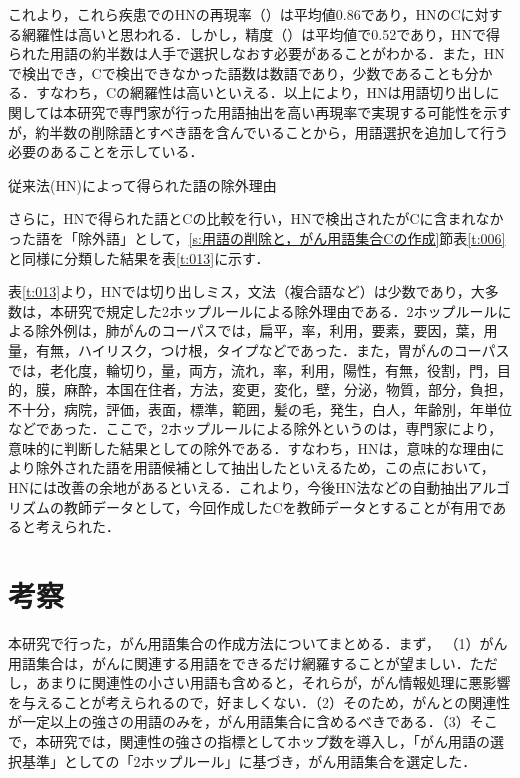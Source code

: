 \documentclass[japanese]{jnlp_1.4}
\def\maru#1{}
\begin{document}
これより，これら疾患でのHNの再現率（\maru{8}）は平均値0.86であり，HNのCに対する網羅性は高いと思われる．しかし，精度（\maru{7}）は平均値で0.52であり，HNで得られた用語の約半数は人手で選択しなおす必要があることがわかる．また，HNで検出でき，Cで検出できなかった語数\maru{6}は数語であり，少数であることも分かる．すなわち，Cの網羅性は高いといえる．以上により，HNは用語切り出しに関しては本研究で専門家が行った用語抽出を高い再現率で実現する可能性を示すが，約半数の削除語とすべき語を含んでいることから，用語選択を追加して行う必要のあることを示している．

\begin{table}[b]
 \caption{従来法(HN)によって得られた語の除外理由}
 \begin{center}

 \end{center}
 \label{t:013}
\end{table}

さらに，HNで得られた語とCの比較を行い，HNで検出されたがCに含まれなかった語を「除外語」として，\ref{s:用語の削除と，がん用語集合Cの作成}節表\ref{t:006}と同様に分類した結果を表\ref{t:013}に示す．

表\ref{t:013}より，HNでは切り出しミス，文法（複合語など）は少数であり，大多数は，本研究で規定した2ホップルールによる除外理由である．2ホップルールによる除外例は，肺がんのコーパスでは，扁平，率，利用，要素，要因，葉，用量，有無，ハイリスク，つけ根，タイプなどであった．また，胃がんのコーパスでは，老化度，輪切り，量，両方，流れ，率，利用，陽性，有無，役割，門，目的，膜，麻酔，本国在住者，方法，変更，変化，壁，分泌，物質，部分，負担，不十分，病院，評価，表面，標準，範囲，髪の毛，発生，白人，年齢別，年単位などであった．ここで，2ホップルールによる除外というのは，専門家により，意味的に判断した結果としての除外である．すなわち，HNは，意味的な理由により除外された語を用語候補として抽出したといえるため，この点において，HNには改善の余地があるといえる．これより，今後HN法などの自動抽出アルゴリズムの教師データとして，今回作成したCを教師データとすることが有用であると考えられた．


\section{考察}
\label{s:考察}

本研究で行った，がん用語集合の作成方法についてまとめる．まず，
（1）がん用語集合は，がんに関連する用語をできるだけ網羅することが望ましい．ただし，あまりに関連性の小さい用語も含めると，それらが，がん情報処理に悪影響を与えることが考えられるので，好ましくない．（2）そのため，がんとの関連性が一定以上の強さの用語のみを，がん用語集合に含めるべきである．（3）そこで，本研究では，関連性の強さの指標としてホップ数を導入し，「がん用語の選択基準」としての「2ホップルール」に基づき，がん用語集合を選定した．
\end{document}
